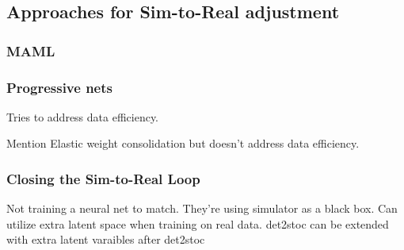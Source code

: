 \subsection{Approaches for Sim-to-Real adjustment}
\subsubsection*{MAML}

\subsubsection*{Progressive nets}
Tries to address data efficiency.

Mention Elastic weight consolidation but doesn't address data efficiency.
\subsubsection*{Closing the Sim-to-Real Loop}
Not training a neural net to match. They're using simulator as a black box. Can utilize extra latent space when training on real data. det2stoc can be extended with extra latent varaibles after det2stoc









